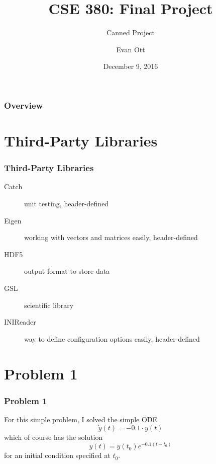 \documentclass{beamer}
\title[Canned Project]{CSE 380: Final Project} %
\subtitle{Canned Project}
\author{Evan Ott} %
\date{December 9, 2016} %
\begin{document}
\begin{frame}
\titlepage %
\end{frame}

\begin{frame}
\frametitle{Overview} %
\tableofcontents %
\end{frame}


\section{Third-Party Libraries}
\begin{frame}
\frametitle{Third-Party Libraries}
\begin{description}
\item[Catch] unit testing, header-defined
\item[Eigen] working with vectors and matrices easily, header-defined
\item[HDF5] output format to store data
\item[GSL] scientific library
\item[INIReader] way to define configuration options easily, header-defined 
\end{description}
\end{frame}


\section{Problem 1}
\begin{frame}
\frametitle{Problem 1}
For this simple problem, I solved the simple ODE
$$\dot{y}(t) = -0.1\cdot y(t)$$
which of course has the solution
$$y(t)=y(t_0) e ^{-0.1(t - t_0)}$$
for an initial condition specified at $t_0$.
\end{frame}
\end{document}
